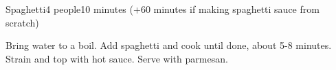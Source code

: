 \documentclass[../Cookbook.tex]{subfiles}
\begin{document}
\begin{recipe}{Spaghetti}{4 people}{10 minutes (+60 minutes if making spaghetti sauce from scratch)}

Bring water to a boil. Add spaghetti and cook until done, about 5-8 minutes. Strain and top with hot sauce. Serve with parmesan.

\end{recipe}
\end{document}
